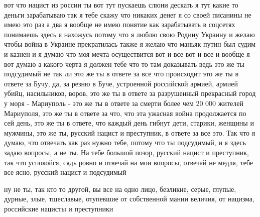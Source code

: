 вот что нацист из россии ты вот тут пускаешь слюни дескать я тут какие то
деньги зарабатываю так я тебе скажу что никаких денег я со своей писанины не
имею это раз а два я вообще не имею понятие как зарабатывать в соцсетях
понимаешь здесь я нахожусь потому что я люблю свою Родину Украину и желаю чтобы
война в Украине прекратилась также я желаю что маньяк путин был судим и казнен
и я думаю что моя мечта осуществится вот и все вот и все и вообще я вот думаю а
какого черта я должен тебе что то там доказывать ведь это же ты подсудимый не
так ли это же ты в ответе за все что происходит это же ты в ответе за Бучу, да,
за резню в Буче, устроенной российской армией, армией убийц, насильников,
воров, это же ты в ответе за разрушенный прекрасный город у моря - Мариуполь -
это же ты в ответе за смерти более чем 20 000 жителей Мариуполя, это же ты в
ответе за что, что эта ужасная война продолжается по сей день, это же ты в
ответе, что каждый день гибнут дети, старики, женщины и мужчины, это же ты,
русский нацист и преступник, в ответе за все это. Так что я думаю, что отвечать
как раз нужно тебе, потому что ты подсудимый, и я здесь задаю вопросы, а не ты.
На тебе большой позор, русский нацист и преступник, так что успокойся, сядь
ровно и отвечай на мои вопросы, отвечай не медля, тебе все ясно, русский нацист
и подсудимый

ну не ты, так кто то другой, вы все на одно лицо, безликие, серые, глупые,
дурные, злые, тщеславые, отупевшие от собственной мании величия, от нацизма,
российские нацисты и преступники

